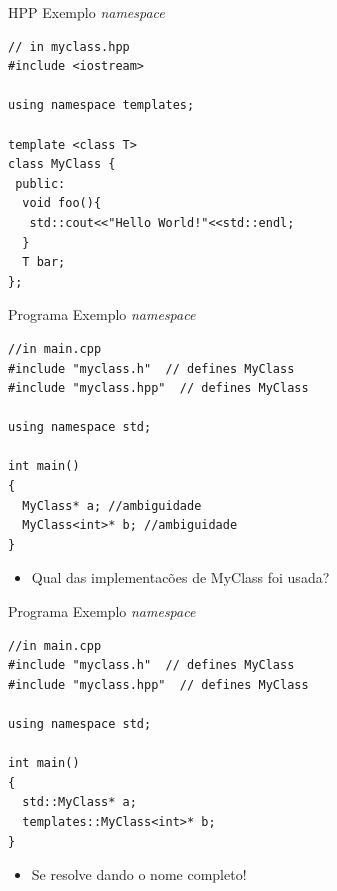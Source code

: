 \documentclass[12pt,table,xcolor={dvipsnames}]{beamer}
\begin{document}
\begin{frame}[fragile]{HPP Exemplo \textit{namespace}}
\begin{lstlisting}
// in myclass.hpp
#include <iostream>

using namespace templates;

template <class T>
class MyClass {
 public:
  void foo(){
   std::cout<<"Hello World!"<<std::endl;
  }
  T bar;
};
\end{lstlisting}
\end{frame}

\begin{frame}[fragile]{Programa Exemplo \textit{namespace}}
\begin{lstlisting}
//in main.cpp
#include "myclass.h"  // defines MyClass
#include "myclass.hpp"  // defines MyClass

using namespace std;

int main()
{
  MyClass* a; //ambiguidade
  MyClass<int>* b; //ambiguidade
}
\end{lstlisting}
\begin{itemize}
\item Qual das implementacões de MyClass foi usada?
\end{itemize}
\end{frame}

\begin{frame}[fragile]{Programa Exemplo \textit{namespace}}
\begin{lstlisting}
//in main.cpp
#include "myclass.h"  // defines MyClass
#include "myclass.hpp"  // defines MyClass

using namespace std;

int main()
{
  std::MyClass* a;
  templates::MyClass<int>* b;
}
\end{lstlisting}
\begin{itemize}
\item Se resolve dando o nome completo!
\end{itemize}
\end{frame}
\end{document}
